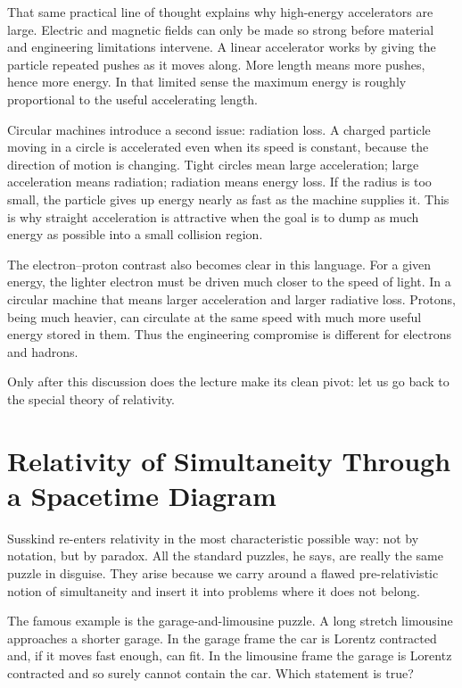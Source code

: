 That same practical line of thought explains why high-energy accelerators are large. Electric and magnetic fields can only be made so strong before material and engineering limitations intervene. A linear accelerator works by giving the particle repeated pushes as it moves along. More length means more pushes, hence more energy. In that limited sense the maximum energy is roughly proportional to the useful accelerating length.

Circular machines introduce a second issue: radiation loss. A charged particle moving in a circle is accelerated even when its speed is constant, because the direction of motion is changing. Tight circles mean large acceleration; large acceleration means radiation; radiation means energy loss. If the radius is too small, the particle gives up energy nearly as fast as the machine supplies it. This is why straight acceleration is attractive when the goal is to dump as much energy as possible into a small collision region.

The electron--proton contrast also becomes clear in this language. For a given energy, the lighter electron must be driven much closer to the speed of light. In a circular machine that means larger acceleration and larger radiative loss. Protons, being much heavier, can circulate at the same speed with much more useful energy stored in them. Thus the engineering compromise is different for electrons and hadrons.

Only after this discussion does the lecture make its clean pivot: let us go back to the special theory of relativity.

\section{Relativity of Simultaneity Through a Spacetime Diagram}

Susskind re-enters relativity in the most characteristic possible way: not by notation, but by paradox. All the standard puzzles, he says, are really the same puzzle in disguise. They arise because we carry around a flawed pre-relativistic notion of simultaneity and insert it into problems where it does not belong.

The famous example is the garage-and-limousine puzzle. A long stretch limousine approaches a shorter garage. In the garage frame the car is Lorentz contracted and, if it moves fast enough, can fit. In the limousine frame the garage is Lorentz contracted and so surely cannot contain the car. Which statement is true?

